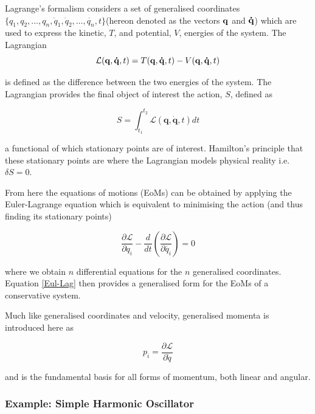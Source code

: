 \documentclass[10pt]{iopart}
\begin{document}
Lagrange's formalism considers a set of generalised coordinates $\{q_1,q_2,\ldots,q_n,\dot{q}_1,\dot{q}_2,\ldots,\dot{q_n},t\}$(hereon denoted as the vectors $\bold{q}$ and $\bold{\dot{q}}$) which are used to express the kinetic, $T$, and potential, $V$, energies of the system. The Lagrangian 
\begin{equation}
	\mathcal{L}(\bold{q},\bold{\dot{q}},t) = T(\bold{q},\bold{\dot{q}},t) - V(\bold{q},\bold{\dot{q}},t)
\end{equation}

\noindent is defined as the difference between the two energies of the system. The Lagrangian provides the final object of interest the action, $S$, defined as

\begin{equation}
		S = \int_{t_1}^{t_2} \mathcal{L}(\mathbf{q},\mathbf{\dot{q}},t) dt
\end{equation}

\noindent a functional of which stationary points are of interest. Hamilton's principle \cite{Goldstein} that these stationary points are where the Lagrangian models physical reality i.e. $\delta S = 0$. 

From here the equations of motions (EoMs) can be obtained by applying the Euler-Lagrange equation which is equivalent to minimising the action (and thus finding its stationary points)

\begin{equation}
\label{Eul-Lag}
	\frac{\partial\mathcal{L}}{\partial q_i} - \frac{d}{dt}\left(\frac{\partial \mathcal{L}}{\partial \dot{q_i}}\right) = 0
\end{equation}

\noindent where we obtain $n$ differential equations for the $n$ generalised coordinates. Equation \ref{Eul-Lag} then provides a generalised form for the EoMs of a conservative system. 

Much like generalised coordinates and velocity, generalised momenta is introduced here as 

\begin{equation}
\label{GeneralisedMomenta}
	p_i = \frac{\partial \mathcal{L}}{\partial \dot q}
\end{equation}

and is the fundamental basis for all forms of momentum, both linear and angular.

\subsubsection{Example: Simple Harmonic Oscillator \\}
\end{document}

